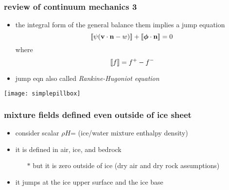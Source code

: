 \documentclass{beamer}
\newcommand {\jl}{[\![}
\newcommand {\jr}{]\!\hskip 0.003cm ]}
\begin{document}
\begin{frame}
  \frametitle{review of continuum mechanics 3}

\begin{itemize}
\item the integral form of the general balance them implies a \alert{jump equation}
	$$\jl \psi (\mathbf{v} \cdot \mathbf{n} - w) \jr + \jl \boldsymbol{\phi} \cdot \mathbf{n} \jr =0$$
where
	$$\jl f \jr = f^+ - f^-$$
\item jump eqn also called \emph{Rankine-Hugoniot equation}
\end{itemize}

  \begin{center}
    \texttt{[image: simplepillbox]}
  \end{center}
\end{frame}


\begin{frame}
  \frametitle{mixture fields defined even outside of ice sheet}
\begin{itemize}
\item consider scalar $\rho H$= (ice/water mixture enthalpy density)
\item it is defined in air, ice, and bedrock
  \begin{itemize}
  \item[$\ast$] but it is zero outside of ice (dry air and dry rock assumptions)
  \end{itemize}
\item it jumps at the ice upper surface and the ice base
\end{itemize}

\begin{center}
\resizebox{0.7\textwidth}{!}{
    
}
\end{center}
\end{frame}
\end{document}
